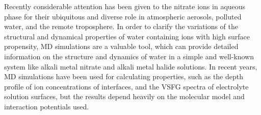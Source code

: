 Recently considerable attention has been given to the nitrate ions in aqueous phase 
for their ubiquitous and diverse role in atmospheric aerosols, polluted water, 
and the remote troposphere. \cite{XuM2009,Jubb2012}
In order to clarify the variations of the structural and dynamical properties 
of water containing ions with high surface propensity, MD simulations are a valuable tool, 
which can provide detailed information on the structure and dynamics  
of water in a simple and well-known system like alkali metal nitrate and alkali metal halide solutions. \cite{KM98}
%
%
In recent years, MD simulations have been used for calculating properties, 
such as the depth profile of ion concentrations of interfaces, \cite{PJ01,PJ02}
and the VSFG spectra of electrolyte solution surfaces, \cite{Gopalakrishnan2006,Johnson2014,Ishiyama2014,Ishiyama2017}
but the results depend heavily on the molecular model and interaction potentials used. \cite{LXD03,MKP04,TI07,MM05}
